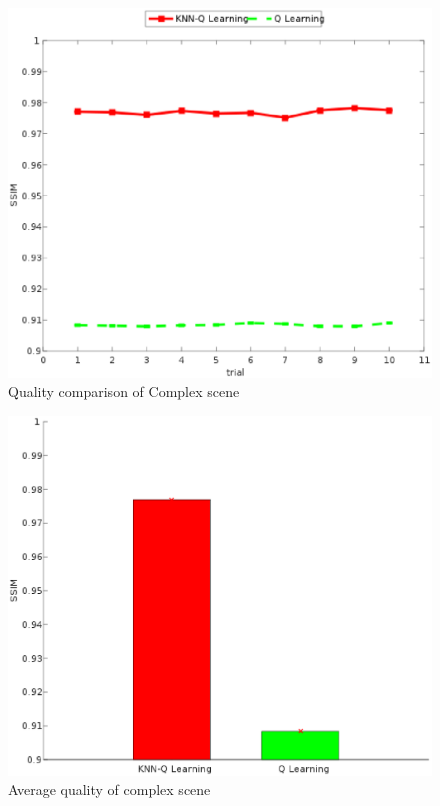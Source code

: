 \documentclass[twocolumn]{article}
\begin{document}
\begin{figure}[htbp]
\centering
\includegraphics[width=\columnwidth]{complex_ssim_compare}
\caption{Quality comparison of Complex scene}
\label{complex_ssim_compare}
\end{figure}
\begin{figure}[htbp]
\centering
\includegraphics[width=\columnwidth]{complex_ssim_bar_graph}
\caption{Average quality of complex scene}
\label{complex_ssim_bar_graph}
\end{figure}
\end{document}

